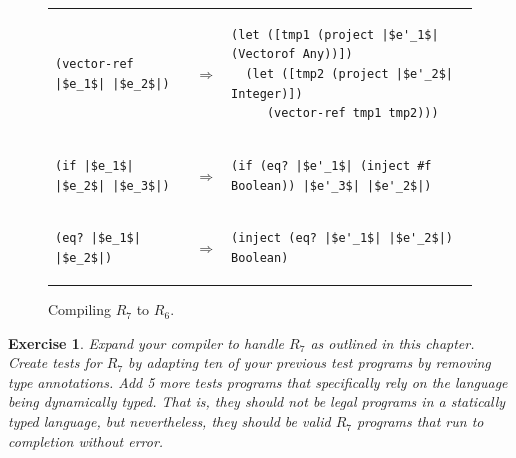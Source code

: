 \documentclass[11pt]{book}
\newtheorem{exercise}[theorem]{Exercise}
\begin{document}
\begin{figure}[btp]
\begin{tabular}{|lll|}
\begin{minipage}{0.6\textwidth}
\end{minipage}
\\[2ex]\hline
\begin{minipage}{0.27\textwidth}
\begin{lstlisting}
(vector-ref |$e_1$| |$e_2$|)
\end{lstlisting}
\end{minipage}
&
$\Rightarrow$
&
\begin{minipage}{0.6\textwidth}
\begin{lstlisting}
(let ([tmp1 (project |$e'_1$| (Vectorof Any))])
  (let ([tmp2 (project |$e'_2$| Integer)])
     (vector-ref tmp1 tmp2)))
\end{lstlisting}
\end{minipage}
\\[2ex]\hline
\begin{minipage}{0.27\textwidth}
\begin{lstlisting}
(if |$e_1$| |$e_2$| |$e_3$|)
\end{lstlisting}
\end{minipage}
&
$\Rightarrow$
&
\begin{minipage}{0.6\textwidth}
\begin{lstlisting}
(if (eq? |$e'_1$| (inject #f Boolean)) |$e'_3$| |$e'_2$|)
\end{lstlisting}
\end{minipage}
\\[2ex]\hline
\begin{minipage}{0.27\textwidth}
\begin{lstlisting}
(eq? |$e_1$| |$e_2$|)
\end{lstlisting}
\end{minipage}
&
$\Rightarrow$
&
\begin{minipage}{0.6\textwidth}
\begin{lstlisting}
(inject (eq? |$e'_1$| |$e'_2$|) Boolean)
\end{lstlisting}
\end{minipage}
\\[2ex]\hline
\end{tabular} 

\caption{Compiling $R_7$ to $R_6$.}
\label{fig:compile-r7-r6}
\end{figure}


\begin{exercise}\normalfont
Expand your compiler to handle $R_7$ as outlined in this chapter.
Create tests for $R_7$ by adapting ten of your previous test programs
by removing type annotations. Add 5 more tests programs that
specifically rely on the language being dynamically typed. That is,
they should not be legal programs in a statically typed language, but
nevertheless, they should be valid $R_7$ programs that run to
completion without error.
\end{exercise}
\end{document}
